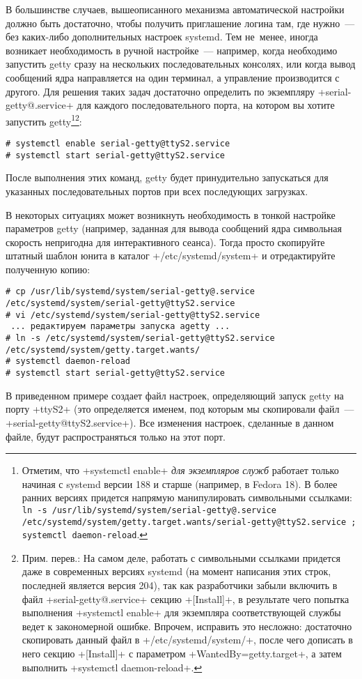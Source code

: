 \documentclass[10pt,oneside,a4paper]{article}
\begin{document}
В большинстве случаев, вышеописанного механизма автоматической настройки должно
быть достаточно, чтобы получить приглашение логина там, где нужно~--- без
каких-либо дополнительных настроек systemd. Тем не~менее, иногда возникает
необходимость в ручной настройке~--- например, когда необходимо запустить getty
сразу на нескольких последовательных консолях, или когда вывод сообщений ядра
направляется на один терминал, а управление производится с другого. Для решения
таких задач достаточно определить по экземпляру +serial-getty@.service+ для
каждого последовательного порта, на котором вы хотите запустить
getty\footnote{Отметим, что +systemctl enable+ \emph{для экземпляров служб}
работает только начиная с systemd версии 188 и старше (например, в Fedora 18). В
более ранних версиях придется напрямую манипулировать символьными ссылками:
\texttt{ln -s /usr/lib/systemd/system/serial-getty@.service
/etc/systemd/system/getty.target.wants/serial-getty@ttyS2.service ; systemctl
daemon-reload}.}\footnote{\label{ftn:enableserial}Прим. перев.: На самом деле,
работать с символьными ссылками придется даже в современных версиях systemd (на
момент написания этих строк, последней является версия 204), так как
разработчики забыли включить в файл +serial-getty@.service+ секцию +[Install]+,
в результате чего попытка выполнения +systemctl enable+ для экземпляра
соответствующей службы ведет к закономерной ошибке. Впрочем, исправить это
несложно: достаточно скопировать данный файл в +/etc/systemd/system/+, после
чего дописать в него секцию +[Install]+ с параметром +WantedBy=getty.target+, а
затем выполнить +systemctl daemon-reload+.}:
\begin{Verbatim}
# systemctl enable serial-getty@ttyS2.service
# systemctl start serial-getty@ttyS2.service
\end{Verbatim}
После выполнения этих команд, getty будет принудительно запускаться для
указанных последовательных портов при всех последующих загрузках.

В некоторых ситуациях может возникнуть необходимость в тонкой настройке
параметров getty (например, заданная для вывода сообщений ядра символьная
скорость непригодна для интерактивного сеанса). Тогда просто скопируйте штатный
шаблон юнита в каталог +/etc/systemd/system+ и отредактируйте полученную копию:
\begin{Verbatim}
# cp /usr/lib/systemd/system/serial-getty@.service /etc/systemd/system/serial-getty@ttyS2.service
# vi /etc/systemd/system/serial-getty@ttyS2.service
 ... редактируем параметры запуска agetty ...
# ln -s /etc/systemd/system/serial-getty@ttyS2.service /etc/systemd/system/getty.target.wants/
# systemctl daemon-reload
# systemctl start serial-getty@ttyS2.service
\end{Verbatim}
В приведенном примере создает файл настроек, определяющий запуск getty на порту
+ttyS2+ (это определяется именем, под которым мы скопировали файл~---
+serial-getty@ttyS2.service+). Все изменения настроек, сделанные в данном файле,
будут распространяться только на этот порт.
\end{document}
